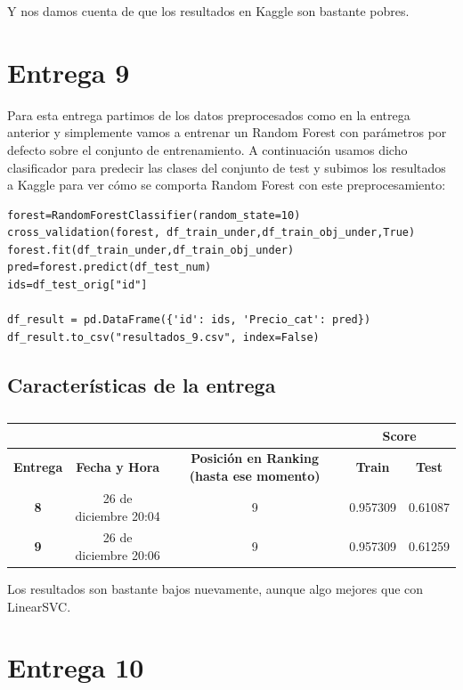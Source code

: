 \documentclass[a4paper,11pt]{article}
\begin{document}
Y nos damos cuenta de que los resultados en Kaggle son bastante pobres.

\section{Entrega 9}

Para esta entrega partimos de los datos preprocesados como en la entrega anterior y simplemente vamos a entrenar un Random Forest con parámetros por defecto sobre el conjunto de entrenamiento. A continuación usamos dicho clasificador para predecir las clases del conjunto de test y subimos los resultados a Kaggle para ver cómo se comporta Random Forest con este preprocesamiento:

\begin{verbatim}
forest=RandomForestClassifier(random_state=10)
cross_validation(forest, df_train_under,df_train_obj_under,True)
forest.fit(df_train_under,df_train_obj_under)
pred=forest.predict(df_test_num)
ids=df_test_orig["id"]

df_result = pd.DataFrame({'id': ids, 'Precio_cat': pred})
df_result.to_csv("resultados_9.csv", index=False)
\end{verbatim}

\subsection{Características de la entrega}
\begin{table}[htbp]
	\caption{}\begin{center}
	\begin{tabular}{|c|c|c|c|c|}
		\hline
		\multicolumn{1}{|l|}{\textbf{}} & \textbf{} & \textbf{} & \multicolumn{2}{c|}{\textbf{Score}} \\ \hline
		\textbf{Entrega} & \textbf{Fecha y Hora} & \textbf{Posición en Ranking (hasta ese momento)} & \textbf{Train} & \textbf{Test} \\ \hline
		\textbf{8} & 26 de diciembre 20:04 & 9 & 0.957309 & 0.61087 \\ \hline
		\textbf{9} & 26 de diciembre 20:06 & 9 & 0.957309 & 0.61259 \\ \hline
	\end{tabular}\end{center}
	\label{}
\end{table}

Los resultados son bastante bajos nuevamente, aunque algo mejores que con LinearSVC.
\section{Entrega 10}
\end{document}
